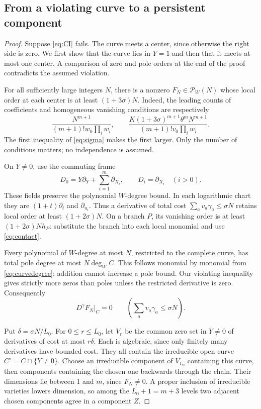 \documentclass[11pt]{article}
\theoremstyle{definition}
\theoremstyle{remark}
\newcommand{\Pcal}{\mathcal P}
\numberwithin{equation}{section}
\begin{document}
\subsection{From a violating curve to a persistent component}
\begin{proof}
Suppose \eqref{eq:CI} fails. The curve meets a center, since otherwise
the right side is zero. We first show that the curve lies in \(Y=1\)
and then that it meets at most one center. A comparison of zero and
pole orders at the end of the proof contradicts the assumed violation.

For all sufficiently large integers \(N\),
there is a nonzero \(F_N\in\Pcal_W(N)\) whose local order at each
center is at least \((1+3\sigma)N\). Indeed, the leading counts of
coefficients and homogeneous vanishing conditions are respectively
\[
 \frac{N^{m+1}}{(m+1)!w_0\prod_iw_i},\qquad
 \frac{K(1+3\sigma)^{m+1}\theta^mN^{m+1}}
 {(m+1)!v_0\prod_iw_i}.
\]
The first inequality of \eqref{eq:sigma} makes the first larger.
Only the number of conditions matters; no independence is assumed.

On \(Y\ne0\), use the commuting frame
\[
 D_0=Y\partial_Y+\sum_{i=1}^m\partial_{X_i},\qquad
 D_i=\partial_{X_i}\quad(i>0).
\]
These fields preserve the polynomial \(W\)-degree bound. In each
logarithmic chart they are \((1+t)\partial_t\) and
\(\partial_{u_i}\). Thus a derivative of total cost
\(\sum_av_a\gamma_a\le\sigma N\) retains local order at least
\((1+2\sigma)N\). On a branch \(P\), its vanishing order is at
least \((1+2\sigma)Nh_P\): substitute the branch into each local
monomial and use \eqref{eq:contact}.

Every polynomial of \(W\)-degree at most \(N\), restricted to the
complete curve, has total pole degree at most \(N\deg_W C\).
This follows monomial by monomial from \eqref{eq:curvedegree}; addition
cannot increase a pole bound. Our violating inequality gives strictly
more zeros than poles unless the restricted derivative is zero.
Consequently
\begin{equation}\label{eq:derivativezero}
 D^\gamma F_N|_C=0\qquad
 \left(\sum_av_a\gamma_a\le\sigma N\right).
\end{equation}

Put \(\delta=\sigma N/L_0\). For \(0\le r\le L_0\), let \(V_r\)
be the common zero set in \(Y\ne0\) of derivatives of cost at most
\(r\delta\). Each is algebraic, since only finitely many derivatives
have bounded cost. They all contain the irreducible open curve
\(C^\circ=C\cap\{Y\ne0\}\).
Choose an irreducible component of \(V_{L_0}\) containing this curve,
then components containing the chosen one backwards through the chain.
Their dimensions lie between 1 and \(m\), since \(F_N\ne0\).
A proper inclusion of irreducible varieties lowers dimension, so among
the \(L_0+1=m+3\) levels two adjacent chosen components agree in a
component \(Z\).


\end{proof}
\end{document}
